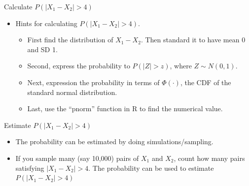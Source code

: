 \documentclass[
  ignorenonframetext,
]{beamer}
\providecommand{\tightlist}{%
  \setlength{\itemsep}{0pt}\setlength{\parskip}{0pt}}
\begin{document}
\begin{frame}{Calculate \(P(|X_1-X_2|>4)\)}
\protect\hypertarget{calculate-px_1-x_24}{}
\begin{itemize}
\tightlist
\item
  Hints for calculating \(P(|X_1-X_2|>4)\).

  \begin{itemize}
  \tightlist
  \item
    First find the distribution of \(X_1-X_2\). Then standard it to have
    mean 0 and SD 1.
  \item
    Second, express the probability to \(P(|Z|>z)\), where
    \(Z\sim N(0,1)\).
  \item
    Next, expression the probability in terms of \(\Phi(\cdot)\), the
    CDF of the standard normal distribution.
  \item
    Last, use the ``pnorm'' function in R to find the numerical value.
  \end{itemize}
\end{itemize}
\end{frame}

\begin{frame}{Estimate \(P(|X_1-X_2|>4)\)}
\protect\hypertarget{estimate-px_1-x_24}{}
\begin{itemize}
\tightlist
\item
  The probability can be estimated by doing simulations/sampling.
\item
  If you sample many (say 10,000) pairs of \(X_1\) and \(X_2\), count
  how many pairs satisfying \(|X_1-X_2|>4\). The probability can be used
  to estimate \(P(|X_1-X_2|>4)\)
\end{itemize}
\end{frame}
\end{document}
